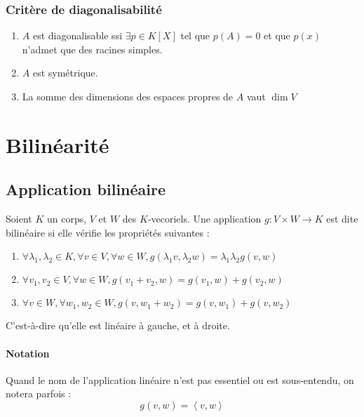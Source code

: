 \documentclass[a4paper,10pt]{article}
\newcommand{\ap}{ \rightarrow} %
\newcommand{\grp}[1]{\left\langle #1 \right\rangle} %
\begin{document}
   \subsubsection{Critère de diagonalisabilité}
    \begin{enumerate}
     \item $A$ est diagonalisable ssi $\exists p\in K[X]$ tel que $p(A)=0$ et que $p(x)$ n'admet que des racines simples.
     \item $A$ est symétrique.
     \item La somme des dimensions des espaces propres de $A$ vaut $\dim V$
    \end{enumerate}

\begin{comment}
  \subsection{Application aux suites couplées}
   Voir cours : Algèbre-lin, Sp-Maths 12/03/08 p1, Mr.Duval
\end{comment}

 \section{Bilinéarité}
  \subsection{Application bilinéaire}
   Soient $K$ un corps, $V$ et $W$ des $K$-vecoriels. Une application $g:V\times W \ap K$ est dite bilinéaire si elle vérifie les propriétés suivantes :
    \begin{enumerate}
     \item $\forall \lambda_1, \lambda_2 \in K, \forall v \in V, \forall w \in W, g(\lambda_1 v, \lambda_2 w)=\lambda_1  \lambda_2 g(v,w)$
     \item $\forall v_1, v_2 \in V, \forall w \in W, g(v_1 + v_2, w)=g(v_1,w)+g(v_2,w)$
     \item $\forall v \in W, \forall w_1,w_2 \in W, g(v,w_1 + w_2)=g(v,w_1)+g(v,w_2)$
    \end{enumerate}
   C'est-à-dire qu'elle est linéaire à gauche, et à droite.

   \paragraph{Notation} Quand le nom de l'application linéaire n'est pas essentiel ou est sous-entendu, on notera parfois :
    $$g(v,w)=\grp{v,w}$$
\end{document}
